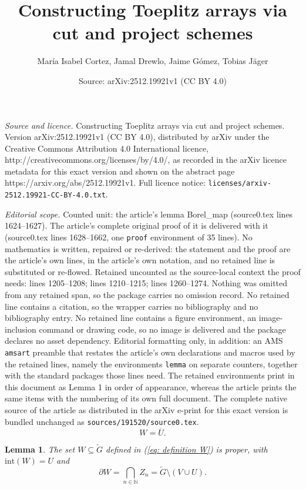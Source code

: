 \documentclass[10pt,a4paper]{amsart}
\title{Constructing Toeplitz arrays via cut and project schemes}
\author{Mar{\'i}a Isabel Cortez, Jamal Drewlo, Jaime G{\'o}mez, Tobias J{\"a}ger}
\date{Source: arXiv:2512.19921v1 (CC BY 4.0)}
\newtheorem{lemma}{Lemma}
\begin{document}
\maketitle

\noindent\emph{Source and licence.} Constructing Toeplitz arrays via cut and project schemes. Version arXiv:2512.19921v1 (CC BY 4.0), distributed by arXiv under the Creative Commons Attribution 4.0 International licence, http://creativecommons.org/licenses/by/4.0/, as recorded in the arXiv licence metadata for this exact version and shown on the abstract page https://arxiv.org/abs/2512.19921v1. Full licence notice: \texttt{licenses/arxiv-2512.19921-CC-BY-4.0.txt}.\par\smallskip

\noindent\textit{Editorial scope.} Counted unit: the article's lemma Borel\_map (source0.tex lines 1624--1627). The article's complete original proof of it is delivered with it (source0.tex lines 1628--1662, one \texttt{proof} environment of 35 lines). No mathematics is written, repaired or re-derived: the statement and the proof are the article's own lines, in the article's own notation, and no retained line is substituted or re-flowed.  Retained uncounted as the source-local context the proof needs: lines 1205--1208; lines 1210--1215; lines 1260--1274.  Nothing was omitted from any retained span, so the package carries no omission record.  No retained line contains a citation, so the wrapper carries no bibliography and no bibliography entry.  No retained line contains a figure environment, an image-inclusion command or drawing code, so no image is delivered and the package declares no asset dependency.  Editorial formatting only, in addition: an AMS \texttt{amsart} preamble that restates the article's own declarations and macros used by the retained lines, namely the environments \texttt{lemma} on separate counters, together with the standard packages those lines need.  The retained environments print in this document as Lemma 1 in order of appearance, whereas the article prints the same items with the numbering of its own full document.  The complete native source of the article as distributed in the arXiv e-print for this exact version is bundled unchanged as \texttt{sources/191520/source0.tex}.
\begin{equation}
    \label{eq: definition W}
    W = \overline{U}.
\end{equation}

\begin{lemma}\label{lem: alternative chara W and partial W}
The set $W\subseteq \overleftarrow{G}$ defined in (\ref{eq: definition W}) is proper, with $\mathrm{int}(W)=U$ and 
 \begin{equation}\label{eq: boundary characterisation}
 \partial W=\bigcap_{n\in\mathbb{N}}Z_n=\overleftarrow{G}\setminus (V\cup U).
 \end{equation}
\end{lemma}
\end{document}
